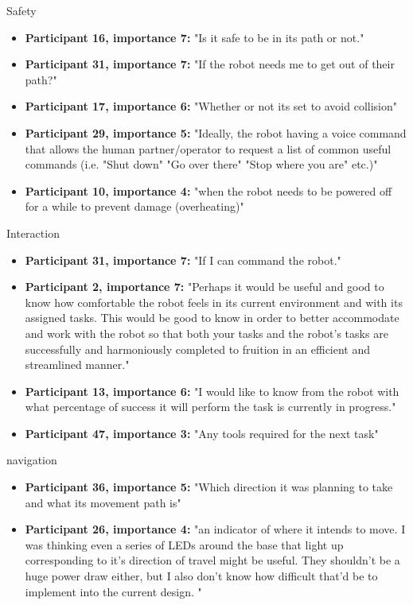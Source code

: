 \documentclass[letterpaper, 10 pt, conference]{ieeeconf}  %
\begin{document}
Safety
\begin{itemize}
    \item  \textbf{Participant 16, importance 7:} "Is it safe to be in its path or not."
    \item  \textbf{Participant 31, importance 7:} "If the robot needs me to get out of their path?"
    \item  \textbf{Participant 17, importance 6:} "Whether or not its set to avoid collision"
    \item  \textbf{Participant 29, importance 5:} "Ideally, the robot having a voice command that allows the human partner/operator to request a list of common useful commands (i.e. "Shut down" "Go over there" "Stop where you are" etc.)"
    \item  \textbf{Participant 10, importance 4:} "when the robot needs to be powered off for a while to prevent damage (overheating)"
\end{itemize}

Interaction
\begin{itemize}
    \item  \textbf{Participant 31, importance 7:} "If I can command the robot."
    \item  \textbf{Participant 2, importance 7:} "Perhaps it would be useful and good to know how comfortable the robot feels in its current environment and with its assigned tasks. This would be good to know in order to better accommodate and work with the robot so that both your tasks and the robot's tasks are successfully and harmoniously completed to fruition in an efficient and streamlined manner."
    \item  \textbf{Participant 13, importance 6:} "I would like to know from the robot with what percentage of success it will perform the task is currently in progress."
    \item  \textbf{Participant 47, importance 3:} "Any tools required for the next task"
\end{itemize}

navigation
\begin{itemize}
    \item  \textbf{Participant 36, importance 5:} "Which direction it was planning to take and what its movement path is"
    \item  \textbf{Participant 26, importance 4:} "an indicator of where it intends to move. I was thinking even a series of LEDs around the base that light up corresponding to it's direction of travel might be useful. They shouldn't be a huge power draw either, but I also don't know how difficult that'd be to implement into the current design. "
\end{itemize}
\end{document}
